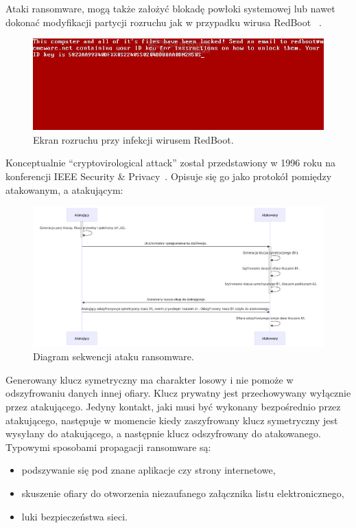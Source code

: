 Ataki ransomware, mogą także założyć blokadę powłoki systemowej lub nawet dokonać modyfikacji partycji rozruchu jak w przypadku wirusa RedBoot ~\cite{redboot}.

\begin{figure}[H]
    \centering
    \includegraphics[width=0.95\linewidth]{rysunki/redboot.png}
    \caption{Ekran rozruchu przy infekcji wirusem RedBoot.}
    \label{fig:enter-label}
\end{figure}

Konceptualnie \foreignquote{english}{cryptovirological attack} został przedstawiony w 1996 roku na konferencji IEEE Security \& Privacy~\cite{yung}. Opisuje się go jako protokół pomiędzy atakowanym, a atakującym:

\begin{figure}[H]
    \centering
    \includegraphics[width=1\linewidth]{rysunki/sequenceRansomware.png}
    \caption{Diagram sekwencji ataku ransomware.}
    \label{fig:enter-label}
\end{figure}
Generowany klucz symetryczny ma charakter losowy i nie pomoże w odszyfrowaniu danych innej ofiary. Klucz prywatny jest przechowywany wyłącznie przez atakującego. Jedyny kontakt, jaki musi być wykonany bezpośrednio przez atakującego, następuje w momencie kiedy zaszyfrowany klucz symetryczny jest wysyłany do atakującego, a następnie klucz odszyfrowany do atakowanego.
\newline
Typowymi sposobami propagacji ransomware są:
\begin{itemize}
    \item podszywanie się pod znane aplikacje czy strony internetowe,
    \item skuszenie ofiary do otworzenia niezaufanego załącznika listu elektronicznego,
    \item luki bezpieczeństwa sieci.
\end{itemize}

